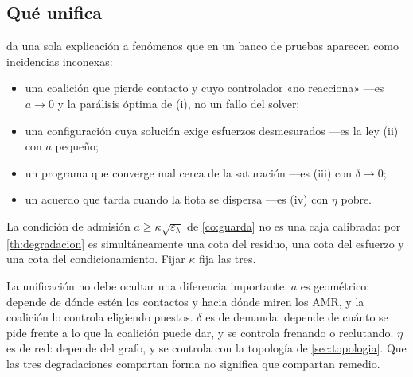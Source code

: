 \subsection{Qué unifica}

 da una sola explicación a fenómenos que en un banco de
pruebas aparecen como incidencias inconexas:

\begin{itemize}[leftmargin=1.4em,topsep=0.2em,itemsep=0.25em]
  \item una coalición que pierde contacto y cuyo controlador «no reacciona»
  —es $a\to0$ y la parálisis óptima de (i), no un fallo del solver;
  \item una configuración cuya solución exige esfuerzos desmesurados
  —es la ley (ii) con $a$ pequeño;
  \item un programa que converge mal cerca de la saturación
  —es (iii) con $\delta\to0$;
  \item un acuerdo que tarda cuando la flota se dispersa
  —es (iv) con $\eta$ pobre.
\end{itemize}

\begin{corolario}
\label{co:guarda-global}
La condición de admisión $a\ge\kappa\sqrt{\varepsilon_\lambda}$ de
\cref{co:guarda} no es una caja calibrada: por \cref{th:degradacion} es
simultáneamente una cota del residuo, una cota del esfuerzo y una cota del
condicionamiento. Fijar $\kappa$ fija las tres.
\end{corolario}

\begin{observacion}
\label{obs:recursos-distintos}
La unificación no debe ocultar una diferencia importante. $a$ es geométrico:
depende de dónde estén los contactos y hacia dónde miren los AMR, y la coalición
lo controla eligiendo puestos. $\delta$ es de demanda: depende de cuánto se pide
frente a lo que la coalición puede dar, y se controla frenando o reclutando.
$\eta$ es de red: depende del grafo, y se controla con la topología de
\cref{sec:topologia}. Que las tres degradaciones compartan forma no significa
que compartan remedio.
\end{observacion}
